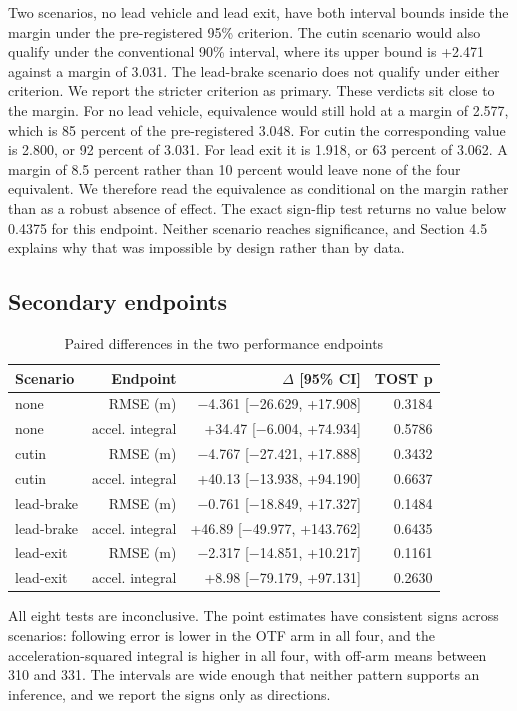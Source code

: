 \documentclass[journal]{IEEEtran}
\begin{document}
Two scenarios, no lead vehicle and lead exit, have both interval bounds inside the margin under the
pre-registered 95\% criterion. The cutin scenario would also qualify under the conventional 90\%
interval, where its upper bound is +2.471 against a margin of 3.031. The lead-brake scenario does not
qualify under either criterion. We report the stricter criterion as primary.
These verdicts sit close to the margin. For no lead vehicle, equivalence would still hold at a
margin of 2.577, which is 85 percent of the pre-registered 3.048. For cutin the corresponding value
is 2.800, or 92 percent of 3.031. For lead exit it is 1.918, or 63 percent of 3.062. A margin of
8.5 percent rather than 10 percent would leave none of the four equivalent. We therefore read the
equivalence as conditional on the margin rather than as a robust absence of effect.
The exact sign-flip test returns no value below 0.4375 for this endpoint. Neither scenario reaches
significance, and Section 4.5 explains why that was impossible by design rather than by data.
\subsection{Secondary endpoints}
\begin{table}[!t]
\centering
\footnotesize
\caption{Paired differences in the two performance endpoints}
\begin{tabular}{lrrr}
\hline
Scenario & Endpoint & $\Delta$ [95\% CI] & TOST p \\
\hline
none & RMSE (m) & $-$4.361 [$-$26.629, +17.908] & 0.3184 \\
none & accel. integral & +34.47 [$-$6.004, +74.934] & 0.5786 \\
cutin & RMSE (m) & $-$4.767 [$-$27.421, +17.888] & 0.3432 \\
cutin & accel. integral & +40.13 [$-$13.938, +94.190] & 0.6637 \\
lead-brake & RMSE (m) & $-$0.761 [$-$18.849, +17.327] & 0.1484 \\
lead-brake & accel. integral & +46.89 [$-$49.977, +143.762] & 0.6435 \\
lead-exit & RMSE (m) & $-$2.317 [$-$14.851, +10.217] & 0.1161 \\
lead-exit & accel. integral & +8.98 [$-$79.179, +97.131] & 0.2630 \\
\hline
\end{tabular}
\end{table}

All eight tests are inconclusive. The point estimates have consistent signs across scenarios: following
error is lower in the OTF arm in all four, and the acceleration-squared integral is higher in all four,
with off-arm means between 310 and 331. The intervals are wide enough that neither pattern supports an
inference, and we report the signs only as directions.
\end{document}
